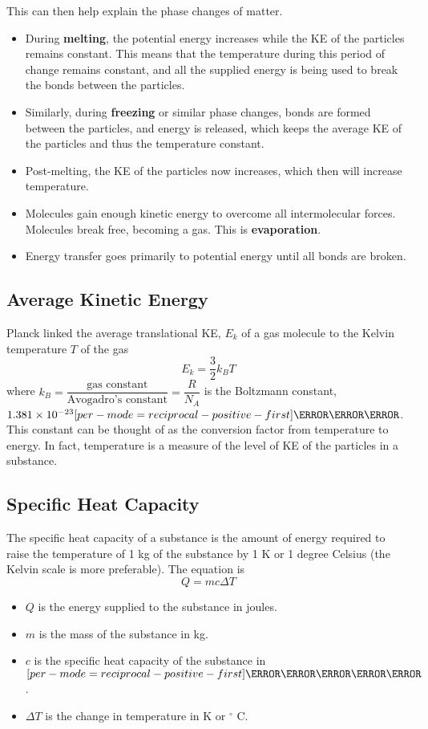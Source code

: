 \documentclass[a4paper,12pt]{article}
\let\oldsi\si
\renewcommand{\si}[1]{\oldsi[per-mode=reciprocal-positive-first]{#1}}
\newcommand{\degsym}{^{\circ}}
\begin{document}
This can then help explain the phase changes of matter.
\begin{itemize}
  \item During \textbf{melting}, the potential energy increases while the KE of the particles remains constant. This means that the temperature during this period of change remains constant, and all the supplied energy is being used to break the bonds between the particles.
  \item Similarly, during \textbf{freezing} or similar phase changes, bonds are formed between the particles, and energy is released, which keeps the average KE of the particles and thus the temperature constant.
  \item Post-melting, the KE of the particles now increases, which then will increase temperature.
  \item Molecules gain enough kinetic energy to overcome all intermolecular forces. Molecules break free, becoming a gas. This is \textbf{evaporation}.
  \item Energy transfer goes primarily to potential energy until all bonds are broken.
\end{itemize}

\subsection{Average Kinetic Energy}

Planck linked the average translational KE, $E_k$ of a gas molecule to the Kelvin temperature $T$ of the gas
$$E_k = \frac{3}{2}k_BT$$
where $k_B = \dfrac{\text{gas constant}}{\text{Avogadro's constant}} = \dfrac{R}{N_A}$ is the Boltzmann constant, $1.381 \times 10^{-23} \si{\joule\per\kelvin}$.
This constant can be thought of as the conversion factor from temperature to energy. In fact, temperature is a measure of the level of KE of the particles in a substance.

\pagebreak

\subsection{Specific Heat Capacity}

The specific heat capacity of a substance is the amount of energy required to raise the temperature of 1 kg of the substance by 1 K or 1 degree Celsius (the Kelvin scale is more preferable). The equation is
$$Q = mc\Delta T$$
\begin{itemize}
  \item  $Q$ is the energy supplied to the substance in joules.
  \item $m$ is the mass of the substance in kg.
  \item $c$ is the specific heat capacity of the substance in $\si{\joule\per\kilogram\per\kelvin}$.
  \item $\Delta T$ is the change in temperature in K or $\degsym$ C.
\end{itemize}
\end{document}
